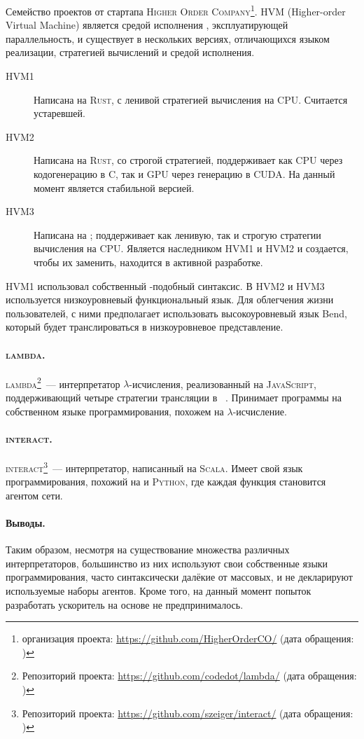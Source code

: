 Семейство проектов от стартапа \textsc{Higher Order Company}\footnote{\GitHub{} организация проекта: \url{https://github.com/HigherOrderCO/} (дата обращения: )}.
HVM (Higher-order Virtual Machine) является средой исполнения \INs{}, эксплуатирующей параллельность, и существует в нескольких версиях, отличающихся языком реализации, стратегией вычислений и средой исполнения.
\begin{description}
      \item[HVM1] Написана на \textsc{Rust}, с ленивой стратегией вычисления на CPU.
            Считается устаревшей.
      \item[HVM2] Написана на \textsc{Rust}, со строгой стратегией, поддерживает как CPU через кодогенерацию в C, так и GPU через генерацию в CUDA.
            На данный момент является стабильной версией.
      \item[HVM3] Написана на \Haskell{}; поддерживает как ленивую, так и строгую стратегии вычисления на CPU.
            Является наследником HVM1 и HVM2 и создается, чтобы их заменить, находится в активной разработке.
\end{description}
HVM1 использовал собственный \Haskell{}-подобный синтаксис.
В HVM2 и HVM3 используется низкоуровневый функциональный язык.
Для облегчения жизни пользователей, с ними предполагает использовать высокоуровневый язык Bend, который будет транслироваться в низкоуровневое представление.

\paragraph{\textsc{lambda}.}

\textsc{lambda}\footnote{Репозиторий проекта: \url{https://github.com/codedot/lambda/} (дата обращения: )}~--- интерпретатор $\lambda$-исчисления, реализованный на \textsc{JavaScript}, поддерживающий четыре стратегии трансляции в \INs{}~\cite{salikhmetovTokenpassingOptimalReduction2016}.
Принимает программы на собственном языке программирования, похожем на $\lambda$-исчисление.

\paragraph{\textsc{interact}.}

\textsc{interact}\footnote{Репозиторий проекта: \url{https://github.com/szeiger/interact/} (дата обращения: )}~--- интерпретатор, написанный на \textsc{Scala}.
Имеет свой язык программирования, похожий на \OCaml{} и \textsc{Python}, где каждая функция становится агентом сети.

\paragraph{Выводы.}

Таким образом, несмотря на существование множества различных интерпретаторов, большинство из них используют свои собственные языки программирования, часто синтаксически далёкие от массовых, и не декларируют используемые наборы агентов.
Кроме того, на данный момент попыток разработать ускоритель на основе \INs{} не предпринималось.
